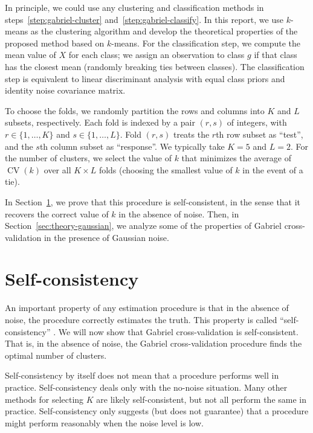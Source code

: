 \documentclass[12pt]{article}
\newcommand{\CV}{\operatorname{CV}}
\begin{document}
\noindent
In principle, we could use any clustering and classification methods in
steps~\ref{step:gabriel-cluster} and~\ref{step:gabriel-classify}.  In this
report, we use $k$-means \citep{hartigan1979algorithm} as the clustering algorithm 
and develop the theoretical properties of the proposed method based on $k$-means. 
For the classification step, we compute the mean value of $X$ for each class; we assign an
observation to class $g$ if that class has the closest mean (randomly breaking
ties between classes).  The classification step is equivalent to linear
discriminant analysis with equal class priors and identity noise covariance
matrix.


To choose the folds, we randomly partition the rows and columns into $K$ and
$L$ subsets, respectively.  Each fold is indexed by a pair $(r,s)$ of
integers, with $r \in \{1, \dotsc, K\}$ and $s \in \{1, \dotsc, L\}$.  Fold
$(r,s)$ treats the $r$th row subset as ``test'', and the $s$th column subset
as ``response''.  We typically take $K = 5$ and $L = 2$.  For the number of
clusters, we select the value of $k$ that minimizes the average of $\CV(k)$
over all $K \times L$ folds (choosing the smallest value of $k$ in the event
of a tie).


In Section~\ref{sec:self-consistent}, we prove that this procedure is
self-consistent, in the sense that it recovers the correct value of $k$ in the
absence of noise. Then, in Section~\ref{sec:theory-gaussian}, we analyze some
of the properties of Gabriel cross-validation in the presence of Gaussian
noise.


\section{Self-consistency}
\label{sec:self-consistent}

An important property of any estimation procedure is that in the absence of
noise, the procedure correctly estimates the truth. This property is called
``self-consistency'' \citep{tarpey96}. We will now show that Gabriel
cross-validation is self-consistent. That is, in the absence of noise, the
Gabriel cross-validation procedure finds the optimal number of clusters.


Self-consistency by itself does not mean that a procedure performs well in
practice. Self-consistency deals only with the no-noise situation.  Many other
methods for selecting $K$ are likely self-consistent, but not all perform the
same in practice. Self-consistency only suggests (but does not guarantee) that
a procedure might perform reasonably when the noise level is low.
\end{document}

